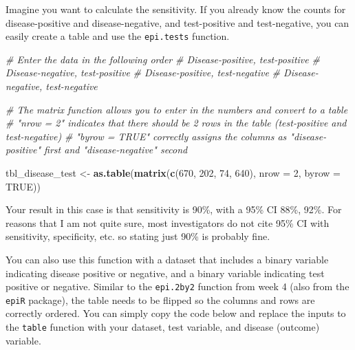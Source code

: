 \documentclass[]{book}
\newenvironment{Shaded}{\begin{snugshade}}{\end{snugshade}}
\newcommand{\CommentTok}[1]{\textcolor[rgb]{0.56,0.35,0.01}{\textit{#1}}}
\newcommand{\DataTypeTok}[1]{\textcolor[rgb]{0.13,0.29,0.53}{#1}}
\newcommand{\DecValTok}[1]{\textcolor[rgb]{0.00,0.00,0.81}{#1}}
\newcommand{\KeywordTok}[1]{\textcolor[rgb]{0.13,0.29,0.53}{\textbf{#1}}}
\newcommand{\NormalTok}[1]{#1}
\newcommand{\OperatorTok}[1]{\textcolor[rgb]{0.81,0.36,0.00}{\textbf{#1}}}
\newcommand{\OtherTok}[1]{\textcolor[rgb]{0.56,0.35,0.01}{#1}}
\newcommand{\StringTok}[1]{\textcolor[rgb]{0.31,0.60,0.02}{#1}}
\begin{document}
Imagine you want to calculate the sensitivity. If you already know the counts for disease-positive and disease-negative, and test-positive and test-negative, you can easily create a table and use the \texttt{epi.tests} function.

\begin{Shaded}
\begin{Highlighting}[]
\CommentTok{# Enter the data in the following order}
  \CommentTok{# Disease-positive, test-positive}
  \CommentTok{# Disease-negative, test-positive}
  \CommentTok{# Disease-positive, test-negative}
  \CommentTok{# Disease-negative, test-negative}

\CommentTok{# The matrix function allows you to enter in the numbers and convert to a table}
\CommentTok{# "nrow = 2" indicates that there should be 2 rows in the table (test-positive and test-negative)}
\CommentTok{# "byrow = TRUE" correctly assigns the columns as "disease-positive" first and "disease-negative" second}

\NormalTok{tbl_disease_test <-}
\StringTok{  }\KeywordTok{as.table}\NormalTok{(}\KeywordTok{matrix}\NormalTok{(}\KeywordTok{c}\NormalTok{(}\DecValTok{670}\NormalTok{, }\DecValTok{202}\NormalTok{, }\DecValTok{74}\NormalTok{, }\DecValTok{640}\NormalTok{),}
                  \DataTypeTok{nrow =} \DecValTok{2}\NormalTok{, }\DataTypeTok{byrow =} \OtherTok{TRUE}\NormalTok{))}
\end{Highlighting}
\end{Shaded}

Your result in this case is that sensitivity is 90\%, with a 95\% CI 88\%, 92\%. For reasons that I am not quite sure, most investigators do not cite 95\% CI with sensitivity, specificity, etc. so stating just 90\% is probably fine.

You can also use this function with a dataset that includes a binary variable indicating disease positive or negative, and a binary variable indicating test positive or negative. Similar to the \texttt{epi.2by2} function from week 4 (also from the \texttt{epiR} package), the table needs to be flipped so the columns and rows are correctly ordered. You can simply copy the code below and replace the inputs to the \texttt{table} function with your dataset, test variable, and disease (outcome) variable.

\begin{Shaded}
\end{Shaded}
\end{document}
